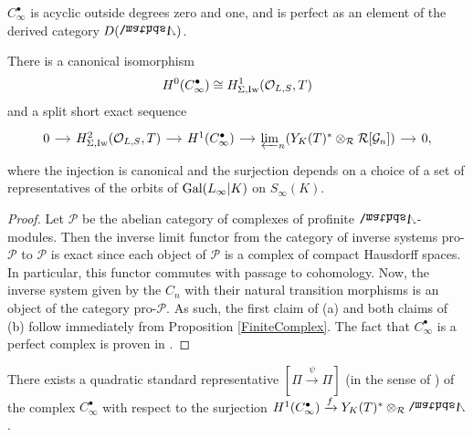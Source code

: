 \documentclass[a4paper, 
headsepline=off, DIV=12, titlepage=false]{scrartcl}
\begin{document}
\begin{prop}\phantom{phantom}
\begin{liste}
    \item{$C^\bullet_\infty$ is acyclic outside degrees zero and one, and is perfect as an element of the derived category $D(\bLambda)$.}
    \item{There is a canonical isomorphism
        \begin{align*}
            H^0(C^\bullet_\infty) \cong H^1_{\Sigma, \mathrm{Iw}}(\mathcal{O}_{L,S}, T)
        \end{align*}
        and a split short exact sequence
    \begin{equation} \label{yoneda-extension-sequence-H2}
        \begin{tikzcd}[column sep=small] 
            0 \arrow{r} & H^2_{\Sigma,\Iw}(\cO_{L, S}, T) \arrow{r} & H^1(C^\bullet_\infty) \arrow{r} & \varprojlim_n (Y_K(T)^* \otimes_\cR \cR[\cG_n]) \arrow{r} & 0,
        \end{tikzcd}
        \end{equation}
        where the injection is canonical and the surjection depends on a choice of a set of representatives of the orbits of $\text{Gal}( L_\infty | K)$ on $S_\infty(K)$.
    }
\end{liste}
\end{prop}

\begin{proof}
    Let $\mathcal{P}$ be the abelian category of complexes of profinite $\bLambda$-modules. Then the inverse limit functor from the category of inverse systems pro-$\mathcal{P}$ to $\mathcal{P}$ is exact since each object of $\mathcal{P}$ is a complex of compact Hausdorff spaces. In particular, this functor commutes with passage to cohomology. Now, the inverse system  given by the $C_n$ with their natural transition morphisms is an object of the category pro-$\mathcal{P}$. As such, the first claim of (a) and both claims of (b) follow immediately from Proposition \ref{FiniteComplex}. The fact that $C_\infty^\bullet$ is a perfect complex is proven in \cite[Lem.\@ 1.6.5(ii)]{fukaya-kato}.
\end{proof}

\begin{lemma}\label{standard-representative-lemma}
    There exists a quadratic standard representative $[\Pi \xrightarrow{\psi} \Pi]$ (in the sense of \cite[Def.\@ A.6]{EulerSystemsSagaI}) of the complex $C_\infty^\bullet$ with respect to the surjection $H^1(C_\infty^\bullet) \xrightarrow{f} Y_K(T)^* \otimes_\cR \bLambda$. 
\end{lemma}
\end{document}
